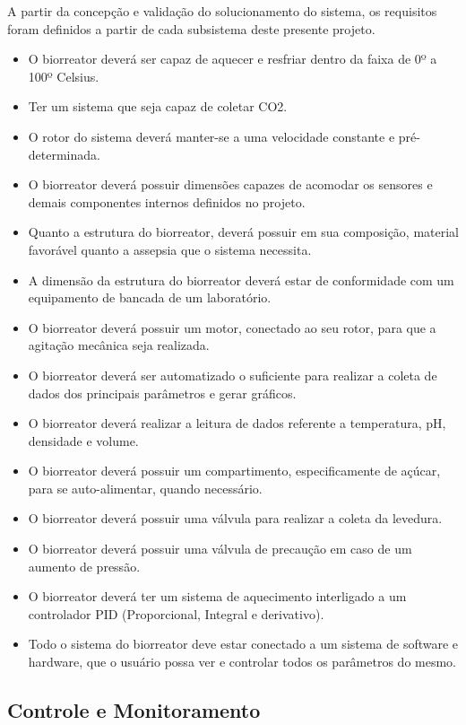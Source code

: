 A partir da concepção e validação do solucionamento do sistema, os requisitos foram definidos a partir de cada subsistema deste presente projeto.

\begin{itemize}
\item O biorreator deverá ser capaz de aquecer e resfriar dentro da faixa de 0º a 100º Celsius.
\item Ter um sistema que seja capaz de coletar CO2.
\item O rotor do sistema deverá manter-se a uma velocidade constante e pré-determinada.
\item O biorreator deverá possuir dimensões capazes de acomodar os sensores e demais componentes internos definidos no projeto.
\item Quanto a estrutura do biorreator, deverá possuir em sua composição, material favorável quanto a assepsia que o sistema necessita.
\item A dimensão da estrutura do biorreator deverá estar de conformidade com um equipamento de bancada de um laboratório.
\item O biorreator deverá possuir um motor, conectado ao seu rotor, para que a agitação mecânica seja realizada.
\item O biorreator deverá ser automatizado o suficiente para realizar a coleta de dados dos principais parâmetros e gerar gráficos.
\item O biorreator deverá realizar a leitura de dados referente a temperatura, pH, densidade e volume.
\item O biorreator deverá possuir um compartimento, especificamente de açúcar, para se auto-alimentar, quando necessário.
\item O biorreator deverá possuir uma válvula para realizar a coleta da levedura.
\item O biorreator deverá possuir uma válvula de precaução em caso de um aumento de pressão.
\item O biorreator deverá ter um sistema de aquecimento interligado a um controlador PID (Proporcional, Integral e derivativo).
\item Todo o sistema do biorreator deve estar conectado a um sistema de software e  hardware, que o usuário possa ver e controlar todos os parâmetros do mesmo.
\end{itemize}

\subsection{Controle e Monitoramento}

